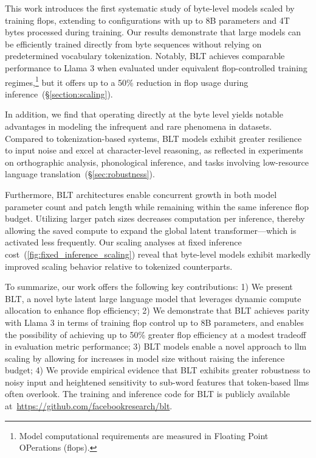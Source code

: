 This work introduces the first systematic study of byte-level models scaled by training flops, extending to configurations with up to 8B parameters and 4T bytes processed during training. Our results demonstrate that large models can be efficiently trained directly from byte sequences without relying on predetermined vocabulary tokenization. Notably, {\textsc BLT} achieves comparable performance to Llama 3 when evaluated under equivalent flop-controlled training regimes,\footnote{Model computational requirements are measured in Floating Point OPerations (flops).} but it offers up to a 50\% reduction in flop usage during inference~(\S\ref{section:scaling}).

In addition, we find that operating directly at the byte level yields notable advantages in modeling the infrequent and rare phenomena in datasets. Compared to tokenization-based systems, {\textsc BLT} models exhibit greater resilience to input noise and excel at character-level reasoning, as reflected in experiments on orthographic analysis, phonological inference, and tasks involving low-resource language translation~(\S\ref{sec:robustness}).

Furthermore, {\textsc BLT} architectures enable concurrent growth in both model parameter count and patch length while remaining within the same inference flop budget. Utilizing larger patch sizes decreases computation per inference, thereby allowing the saved compute to expand the global latent transformer—which is activated less frequently. Our scaling analyses at fixed inference cost~(\autoref{fig:fixed_inference_scaling}) reveal that byte-level models exhibit markedly improved scaling behavior relative to tokenized counterparts.

To summarize, our work offers the following key contributions: 1) We present {\textsc BLT}, a novel byte latent large language model that leverages dynamic compute allocation to enhance flop efficiency; 2) We demonstrate that {\textsc BLT} achieves parity with Llama 3 in terms of training flop control up to 8B parameters, and enables the possibility of achieving up to 50\% greater flop efficiency at a modest tradeoff in evaluation metric performance; 3) {\textsc BLT} models enable a novel approach to llm scaling by allowing for increases in model size without raising the inference budget; 4) We provide empirical evidence that {\textsc BLT} exhibits greater robustness to noisy input and heightened sensitivity to sub-word features that token-based llms often overlook. The training and inference code for {\textsc BLT} is publicly available at~\url{https://github.com/facebookresearch/blt}.

